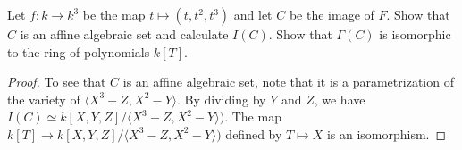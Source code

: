 \documentclass{article}
\begin{document}
 Let $f: k \to k^3$ be the map $t \mapsto (t, t^2, t^3)$ and let $C$ be the image of $F$. Show that $C$ is an affine algebraic set and calculate $I(C)$. Show that $\Gamma(C)$ is isomorphic to the ring of polynomials $k[T]$.
\begin{proof}
To see that $C$ is an affine algebraic set, note that it is a parametrization of the variety of $\langle X^3 - Z, X^2 - Y \rangle$.
By dividing by $Y$ and $Z$, we have $I(C) \simeq k[X,Y,Z] / \langle X^3 - Z, X^2 - Y \rangle)$.  The map $k[T] \to k[X,Y,Z] / \langle X^3 - Z, X^2 - Y \rangle)$ defined by $T \mapsto X$ is an isomorphism.
\end{proof}
\end{document}
